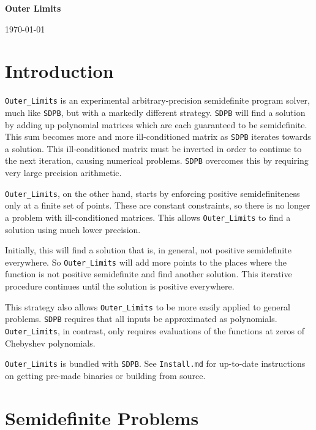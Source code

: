 \documentclass[12pt]{article}
\numberwithin{equation}{section}
\begin{document}
{\Large
\begin{center}
{\bf Outer Limits \\\vspace{.1in}}
\end{center}
}
\begin{center}
\noindent \today
\end{center}
\tableofcontents
\section{Introduction}
\label{sec:introduction}

\texttt{Outer\_Limits} is an experimental arbitrary-precision
semidefinite program solver, much like \texttt{SDPB}, but with a
markedly different strategy.  \texttt{SDPB} will find a solution by
adding up polynomial matrices which are each guaranteed to be
semidefinite.  This sum becomes more and more ill-conditioned matrix
as \texttt{SDPB} iterates towards a solution.  This ill-conditioned
matrix must be inverted in order to continue to the next iteration,
causing numerical problems.  \texttt{SDPB} overcomes this by requiring
very large precision arithmetic.

\texttt{Outer\_Limits}, on the other hand, starts by enforcing positive
semidefiniteness only at a finite set of points.  These are constant
constraints, so there is no longer a problem with ill-conditioned
matrices.  This allows \texttt{Outer\_Limits} to find a solution using
much lower precision.

Initially, this will find a solution that is, in general, not positive
semidefinite everywhere.  So \texttt{Outer\_Limits} will add more
points to the places where the function is not positive semidefinite
and find another solution.  This iterative procedure continues until
the solution is positive everywhere.

This strategy also allows \texttt{Outer\_Limits} to be more easily
applied to general problems.  \texttt{SDPB} requires that all inputs
be approximated as polynomials.  \texttt{Outer\_Limits}, in contrast,
only requires evaluations of the functions at zeros of Chebyshev
polynomials.

\texttt{Outer\_Limits} is bundled with \texttt{SDPB}.  See
\texttt{Install.md} for up-to-date instructions on getting pre-made
binaries or building from source.

\section{Semidefinite Problems}
\label{sec:semidefinite}
\end{document}
